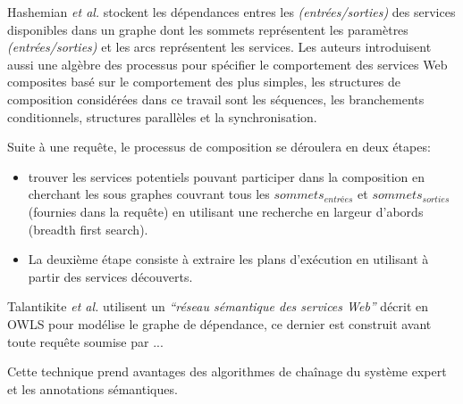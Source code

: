   \begin{text}
    Hashemian \textit{et al.} \cite{hashemian2006graph} stockent les
    dépendances entres les \textit{(entrées/sorties)} des services
    disponibles dans un graphe dont les sommets représentent les
    paramètres \textit{(entrées/sorties)} et les arcs représentent les
    services. Les auteurs introduisent aussi une algèbre des processus
    pour spécifier le comportement des services Web composites basé
    sur le comportement des plus simples, les structures de
    composition considérées dans ce travail sont les séquences, les
    branchements conditionnels, structures parallèles et la
    synchronisation.

    Suite à une requête, le processus de composition se déroulera en
    deux étapes:

    \begin{itemize}
    \item trouver les services potentiels pouvant participer dans la
      composition en cherchant les sous graphes couvrant tous les
      $sommets_{entrées}$ et $sommets_{sorties}$ (fournies dans la
      requête) en utilisant une recherche en largeur d'abords (breadth
      first search).

    \item La deuxième étape consiste à extraire les plans d'exécution
      en utilisant à partir des services découverts.
    \end{itemize}
  \end{text}

  \begin{text}

    Talantikite \textit{et al.} \cite{talantikite2009semantic}
    utilisent un \emph{``réseau sémantique des services Web''} décrit
    en \textsc{OWLS} pour modélise le graphe de dépendance, ce dernier
    est construit avant toute requête soumise par ...

    Cette technique prend avantages des algorithmes de chaînage du
    système expert et les annotations sémantiques.
  \end{text}


